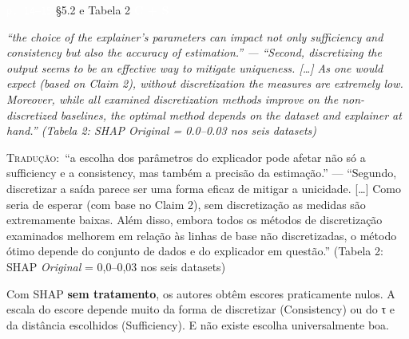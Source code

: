 \documentclass[11pt,a4paper]{article}
\newcommand{\metrictag}[2]{{\setlength{\fboxsep}{1.5pt}%
  \ifstrequal{#1}{c}{\colorbox{cC}{\textcolor{white}{\scriptsize\textbf{#2}}}}{%
  \ifstrequal{#1}{s}{\colorbox{cS}{\textcolor{white}{\scriptsize\textbf{#2}}}}{%
  \colorbox{black!60}{\textcolor{white}{\scriptsize\textbf{#2}}}}}}}
\newcommand{\pagechip}[1]{{\setlength{\fboxsep}{1.5pt}\colorbox{cAcc}{\textcolor{white}{\scriptsize\texttt{#1}}}}}
\newenvironment{origquote}{\par\itshape\small}{\par}
\newenvironment{tradquote}{\par\small\textsc{Tradução:}\ }{\par}
\newcommand{\explab}[1]{\par\smallskip{\small\color{cAcc}\textbf{\MakeUppercase{#1}}}\par}
\begin{document}
\begin{citacard}{\pagechip{p. 14–15} §5.2 e Tabela 2 \metrictag{cs}{C + S}}
\begin{origquote}“the choice of the explainer’s parameters can impact not only sufficiency and consistency but also the accuracy of estimation.” — “Second, discretizing the output seems to be an effective way to mitigate uniqueness. […] As one would expect (based on Claim 2), without discretization the measures are extremely low. Moreover, while all examined discretization methods improve on the non-discretized baselines, the optimal method depends on the dataset and explainer at hand.” (Tabela 2: SHAP \textit{Original} = 0.0–0.03 nos seis datasets)\end{origquote}
\begin{tradquote}“a escolha dos parâmetros do explicador pode afetar não só a sufficiency e a consistency, mas também a precisão da estimação.” — “Segundo, discretizar a saída parece ser uma forma eficaz de mitigar a unicidade. […] Como seria de esperar (com base no Claim 2), sem discretização as medidas são extremamente baixas. Além disso, embora todos os métodos de discretização examinados melhorem em relação às linhas de base não discretizadas, o método ótimo depende do conjunto de dados e do explicador em questão.” (Tabela 2: SHAP \textit{Original} = 0,0–0,03 nos seis datasets)\end{tradquote}
\explab{Explicação}
Com SHAP \textbf{sem tratamento}, os autores obtêm escores praticamente nulos. A escala do escore depende muito da forma de discretizar (Consistency) ou do τ e da distância escolhidos (Sufficiency). E não existe escolha universalmente boa.
\end{citacard}
\end{document}
